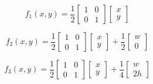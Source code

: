 \documentclass[usenames, dvipsnames, aspectratio=169]{beamer}
\begin{document}
\begin{frame}[t, c]{}{}
  \vfill
  \large

  \begin{minipage}{.48\textwidth}
    \[
    f_1(x, y)
    =
    \dfrac{1}{2}
    \begin{bmatrix}
      1 & 0 \\ 0 & 1
    \end{bmatrix}
    \begin{bmatrix}
      x \\ y
    \end{bmatrix}
    \]
  \end{minipage}%
  \hfill
  \begin{minipage}{.48\textwidth}
    \[
    f_2(x, y)
    =
    \dfrac{1}{2}
    \begin{bmatrix}
      1 & 0 \\ 0 & 1
    \end{bmatrix}
    \begin{bmatrix}
      x \\ y
    \end{bmatrix}
    +
    \dfrac{1}{2}
    \begin{bmatrix}
      w \\ 0
    \end{bmatrix}
    \]
  \end{minipage}

  \vfill

  \[
  f_3(x, y)
  =
  \dfrac{1}{2}
  \begin{bmatrix}
    1 & 0 \\ 0 & 1
  \end{bmatrix}
  \begin{bmatrix}
    x \\ y
  \end{bmatrix}
  +
  \dfrac{1}{4}
  \begin{bmatrix}
    w \\ 2h
  \end{bmatrix}
  \]

  \vfill
\end{frame}
\end{document}

